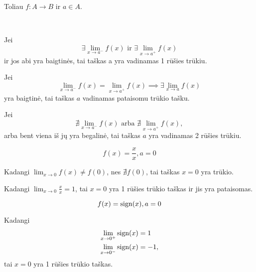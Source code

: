 \begin{note}
  Toliau $f: A \to B$ ir $a \in A$.
\end{note}

\begin{defn}
  \begin{description}
    \hfill \\
    \item[1 rūšies trūkis] Jei 
      \begin{equation*}
        \exists \lim_{x \to a^{-}} f(x) 
        \text{ ir }
        \exists \lim_{x \to a^{+}} f(x) 
      \end{equation*}
       ir jos abi yra baigtinės, tai
      taškas a yra vadinamas 1 rūšies trūkiu.
    \item[pataisomas trūkis] Jei
      \begin{equation*}
        \lim_{x \to a^{-}} f(x) = \lim_{x \to a^{+}} f(x) 
        \implies \exists \lim_{x \to a} f(x)
      \end{equation*}
      yra baigtinė, tai taškas $a$ vadinamas pataisomu trūkio tašku.
    \item[2 rūšies trūkis] Jei
      \begin{equation*}
        \nexists \lim_{x \to a^{-}} f(x)
        \text{ arba }
        \nexists \lim_{x \to a^{+}} f(x),
      \end{equation*}
      arba bent viena iš jų yra begalinė, tai taškas $a$ yra vadinamas
      2 rūšies trūkiu.
  \end{description}
\end{defn}

\begin{exmp}
  \begin{equation*}
    f(x) = \frac{x}{x}, a = 0
  \end{equation*}

  Kadangi $\lim_{x \to 0} f(x) \neq f(0)$, nes $\nexists f(0)$, tai
  taškas $x = 0$ yra trūkio.

  Kadangi $\lim_{x \to 0} \frac{x}{x} = 1$, tai $x = 0$ yra 1 rūšies
  trūkio taškas ir jis yra pataisomas.
\end{exmp}

\begin{exmp}
  \begin{equation*}
    f(x) = \mathop{\text{sign}}(x), a = 0
  \end{equation*}

  Kadangi
  \begin{align*}
    \lim_{x \to 0^{+}} \mathop{\text{sign}}(x) &= 1 \\
    \lim_{x \to 0^{-}} \mathop{\text{sign}}(x) &= -1,
  \end{align*}
  tai $x = 0$ yra 1 rūšies trūkio taškas.
\end{exmp}

